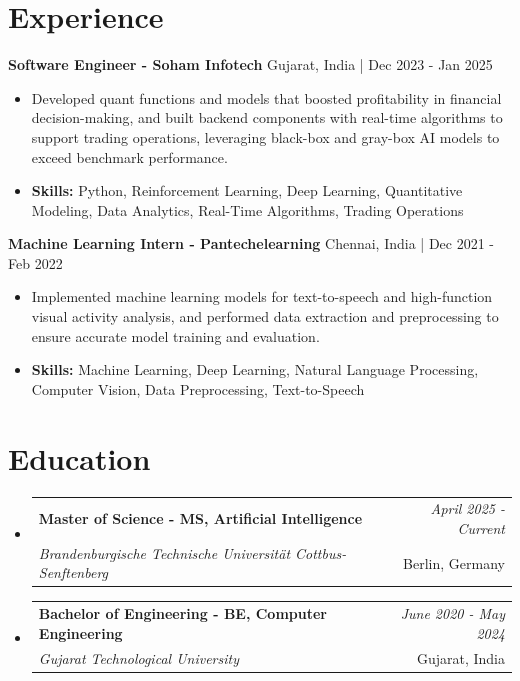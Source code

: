 \documentclass[a4paper,11pt]{article}
\makeatletter
\newcommand{\resumeSubheading}[4]{
\vspace{0.5mm}\item
    \begin{tabular*}{0.98\textwidth}[t]{l@{\extracolsep{\fill}}r}
        \textbf{#1} & \textit{\footnotesize{#4}} \\
        \textit{\footnotesize{#3}} &  \footnotesize{#2}\\
    \end{tabular*}
    \vspace{-2.4mm}
}
\makeatother
\begin{document}
\section{\textbf{Experience}}


\vspace{1mm}
  \textbf{Software Engineer - Soham Infotech} \hfill Gujarat, India | Dec 2023 - Jan 2025
\vspace{-1.5mm} %
\begin{itemize}
  \item Developed quant functions and models that boosted profitability in financial decision-making, and built backend components with real-time algorithms to support trading operations, leveraging black-box and gray-box AI models to exceed benchmark performance.

\vspace{-2mm}
  \item \textbf{Skills:} Python, Reinforcement Learning, Deep Learning, Quantitative Modeling, Data Analytics, Real-Time Algorithms, Trading Operations
\end{itemize}

\vspace{1mm}
  \textbf{Machine Learning Intern - Pantechelearning} \hfill Chennai, India | Dec 2021 - Feb 2022
\vspace{-1.5mm} %
\begin{itemize}
  \item Implemented machine learning models for text-to-speech and high-function visual activity analysis, and performed data extraction and preprocessing to ensure accurate model training and evaluation.
\vspace{-2mm}
  \item \textbf{Skills:} Machine Learning, Deep Learning, Natural Language Processing, Computer Vision, Data Preprocessing, Text-to-Speech
\end{itemize}\section{\textbf{Education}}
\vspace{-0.4mm}

\begin{itemize}
\resumeSubheading
{Master of Science - MS, Artificial Intelligence }{Berlin, Germany}
{Brandenburgische Technische Universität Cottbus-Senftenberg  }{April 2025 - Current}

\vspace{1.0mm} %
\resumeSubheading
{Bachelor of Engineering - BE, Computer Engineering  }{Gujarat, India}
{Gujarat Technological University }{June 2020 - May 2024}

\end{itemize}
\end{document}
